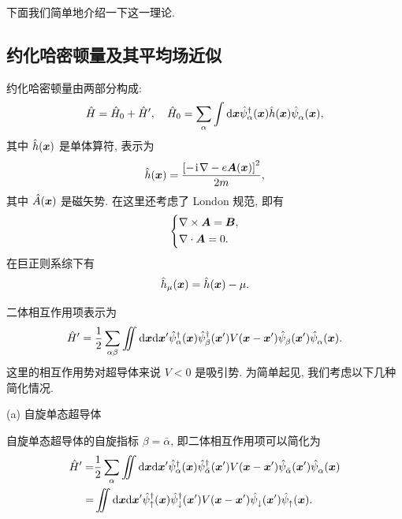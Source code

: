 下面我们简单地介绍一下这一理论. 
\subsection{约化哈密顿量及其平均场近似}
约化哈密顿量由两部分构成:
\begin{equation}
    \hat{H}=\hat{H}_0+\hat{H}',\quad \hat{H}_0=\sum_\alpha \int\mathrm{d} \boldsymbol{x}\hat{\psi}_\alpha^{\dagger}(\boldsymbol{x})\hat{h}(\boldsymbol{x})\hat{\psi}_\alpha^{ }(\boldsymbol{x}),
\end{equation}
其中 $\hat{h}(\boldsymbol{x})$ 是单体算符, 表示为 
\begin{equation}
    \hat{h}(\boldsymbol{x})=\frac{\left[ -\hspace{0.1em}\mathrm{i}\hspace{0.1em}\nabla-e\boldsymbol{A}(\boldsymbol{x}) \right]^2}{2m},
\end{equation}
其中 $\hat{A}(\boldsymbol{x})$ 是磁矢势. 在这里还考虑了 London 规范, 即有 
\begin{equation}
    \left\{
        \begin{aligned}
            &\nabla\times\boldsymbol{A}=\boldsymbol{B},\\
            &\nabla\cdot\boldsymbol{A}=0.
        \end{aligned}
    \right.
\end{equation}
在巨正则系综下有 
\begin{equation}
    \hat{h}_\mu(\boldsymbol{x})=\hat{h}(\boldsymbol{x})-\mu.
\end{equation}

二体相互作用项表示为 
\begin{equation}
    \hat{H}'=\frac{1}{2}\sum_{\alpha\beta}\iint\mathrm{d}\boldsymbol{x}\mathrm{d} \boldsymbol{x}'\hat{\psi}_\alpha^\dagger (\boldsymbol{x})\hat{\psi}_{\beta}^\dagger(\boldsymbol{x}')V(\boldsymbol{x}-\boldsymbol{x}')\hat{\psi}_{\beta}^{ }(\boldsymbol{x}')\hat{\psi}_{\alpha}^{ }(\boldsymbol{x}).
\end{equation}
这里的相互作用势对超导体来说 $V<0$ 是吸引势. 为简单起见, 我们考虑以下几种简化情况.

(a) 自旋单态超导体 

自旋单态超导体的自旋指标 $\beta=\bar{\alpha}$, 即二体相互作用项可以简化为 
  \begin{align}
        \hat{H}'=&\frac{1}{2}\sum_{\alpha}\iint\mathrm{d}\boldsymbol{x}\mathrm{d} \boldsymbol{x}'\hat{\psi}_\alpha^\dagger (\boldsymbol{x})\hat{\psi}_{\bar{\alpha}}^\dagger(\boldsymbol{x}')V(\boldsymbol{x}-\boldsymbol{x}')\hat{\psi}_{\bar{\alpha}}^{ }(\boldsymbol{x}')\hat{\psi}_{\alpha}^{ }(\boldsymbol{x})\nonumber\\
        =&\iint\mathrm{d}\boldsymbol{x}\mathrm{d}\boldsymbol{x}'\hat\psi_{\uparrow}^\dagger(\boldsymbol{x})\hat\psi_\downarrow^\dagger(\boldsymbol{x}')V(\boldsymbol{x}-\boldsymbol{x}')\hat\psi_\downarrow^{ }(\boldsymbol{x}')\hat\psi_\uparrow^{ }(\boldsymbol{x}).
    \end{align}

